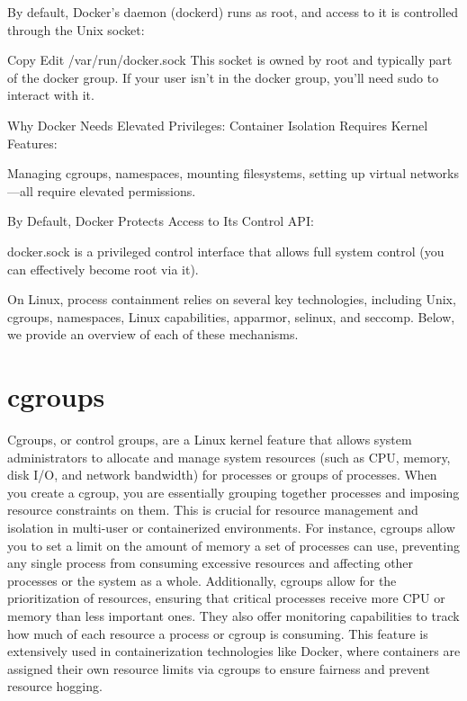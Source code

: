 \documentclass[12pt]{report}
\begin{document}
\begin{doublespace}
By default, Docker’s daemon (dockerd) runs as root, and access to it is controlled through the Unix socket:


Copy
Edit
/var/run/docker.sock
This socket is owned by root and typically part of the docker group.
If your user isn’t in the docker group, you’ll need sudo to interact with it.

Why Docker Needs Elevated Privileges:
Container Isolation Requires Kernel Features:

Managing cgroups, namespaces, mounting filesystems, setting up virtual networks—all require elevated permissions.

By Default, Docker Protects Access to Its Control API:

docker.sock is a privileged control interface that allows full system control (you can effectively become root via it).






On Linux, process containment relies on several key technologies, including Unix, cgroups, namespaces, Linux capabilities, apparmor, selinux, and seccomp. Below, we provide an overview of each of these mechanisms.

\section{cgroups}
Cgroups, or control groups, are a Linux kernel feature that allows system administrators to allocate and manage system resources (such as CPU, memory, disk I/O, and network bandwidth) for processes or groups of processes. When you create a cgroup, you are essentially grouping together processes and imposing resource constraints on them. This is crucial for resource management and isolation in multi-user or containerized environments. For instance, cgroups allow you to set a limit on the amount of memory a set of processes can use, preventing any single process from consuming excessive resources and affecting other processes or the system as a whole. Additionally, cgroups allow for the prioritization of resources, ensuring that critical processes receive more CPU or memory than less important ones. They also offer monitoring capabilities to track how much of each resource a process or cgroup is consuming. This feature is extensively used in containerization technologies like Docker, where containers are assigned their own resource limits via cgroups to ensure fairness and prevent resource hogging.


\end{doublespace}
\end{document}
